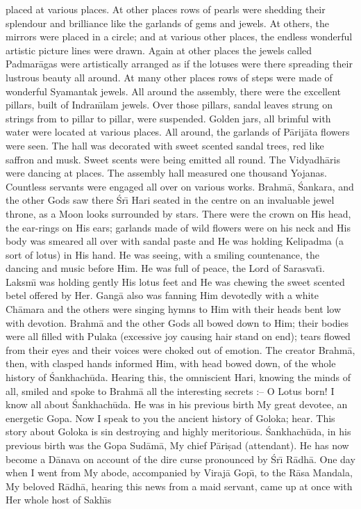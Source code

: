 placed at various places. At other places rows of pearls were shedding their splendour and brilliance like the garlands of gems and jewels. At others, the mirrors were placed in a circle; and at various other places, the endless wonderful artistic picture lines were drawn. Again at other places the jewels called Padmar\=agas were artistically arranged as if the lotuses were there spreading their lustrous beauty all around. At many other places rows of steps were made of wonderful Syamantak jewels. All around the assembly, there were the excellent pillars, built of Indran\={\i}lam jewels. Over those pillars, sandal leaves strung on strings from to pillar to pillar, were suspended. Golden jars, all brimful with water were located at various places. All around, the garlands of P\=arij\=ata flowers were seen. The hall was decorated with sweet scented sandal trees, red like saffron and musk. Sweet scents were being emitted all round. The Vidyadh\=aris were dancing at places. The assembly hall measured one thousand Yojanas. Countless servants were engaged all over on various works. Brahm\=a, \'Sankara, and the other Gods saw there \'Sr\={\i} Hari seated in the centre on an invaluable jewel throne, as a Moon looks surrounded by stars. There were the crown on His head, the ear-rings on His ears; garlands made of wild flowers were on his neck and His body was smeared all over with sandal paste and He was holding Kelipadma (a sort of lotus) in His hand. He was seeing, with a smiling countenance, the dancing and music before Him. He was full of peace, the Lord of Sarasvat\={\i}. Laksm\={\i} was holding gently His lotus feet and He was chewing the sweet scented betel offered by Her. Gang\=a also was fanning Him devotedly with a white Ch\=amara and the others were singing hymns to Him with their heads bent low with devotion. Brahm\=a and the other Gods all bowed down to Him; their bodies were all filled with Pulaka (excessive joy causing hair stand on end); tears flowed from their eyes and their
voices were choked out of emotion. The creator Brahm\=a, then, with clasped hands informed Him, with head bowed down, of the whole history of \'Sankhach\=uda. Hearing this, the omniscient Hari, knowing the minds of all, smiled and spoke to Brahm\=a all the interesting secrets :-- O Lotus born! I know all about \'Sankhach\=uda. He was in his previous birth My great devotee, an energetic Gopa. Now I speak to you the ancient history of Goloka; hear. This story about Goloka is sin destroying and highly meritorious. \'Sankhach\=uda, in his previous birth was the Gopa Sud\=am\=a, My chief P\=ari\d{s}ad (attendant). He has now become a D\=anava on account of the dire curse pronounced by \'Sr\={\i}
R\=adh\=a. One day when I went from My abode, accompanied by Viraj\=a Gop\={\i}, to the R\=asa Mandala, My beloved R\=adh\=a, hearing this news from a maid servant, came up at once with Her whole host of Sakh\={\i}s

